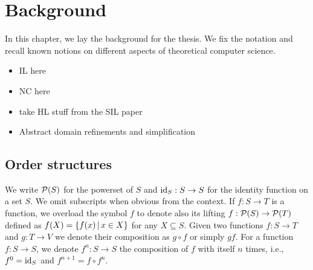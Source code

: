 
\chapter{Background}\label{ch:background}

In this chapter, we lay the background for the thesis. We fix the notation and recall known notions on different aspects of theoretical computer science.

\begin{itemize}
	\item IL here
	\item NC here
	\item take HL stuff from the SIL paper
	\item Abstract domain refinements and simplification
\end{itemize}

\section{Order structures}
We write $\mathcal{P}(S)$ for the powerset of $S$ and $\text{id}_S: S \rightarrow S$ for the identity function on a set $S$. We omit subscripts when obvious from the context. If $f : S \rightarrow T$ is a function, we overload the symbol $f$ to denote also its lifting $f: \mathcal{P}(S) \rightarrow \mathcal{P}(T)$ defined as $f(X) = \{ f(x) \,\vert\, x \in X \}$ for any $X \subseteq S$.
Given two functions $f: S \rightarrow T$ and $g: T \rightarrow V$ we denote their composition as $g \circ f$ or simply $gf$.
For a function $f : S \rightarrow S$, we denote $f^n: S \rightarrow S$ the composition of $f$ with itself $n$ times, i.e., $f^{0} = \text{id}_S$ and $f^{n+1} = f \circ f^{n}$.

